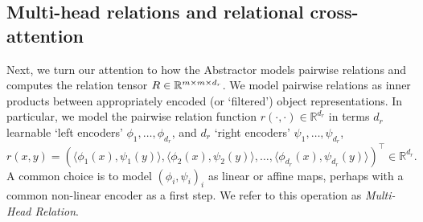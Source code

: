 %
%
%
%
%



\subsection{Multi-head relations and relational cross-attention}\label{ssec:multiheadrelations}

Next, we turn our attention to how the Abstractor models pairwise relations and computes the relation tensor $R \in \mathbb{R}^{m \times m \times d_r}$. We model pairwise relations as inner products between appropriately encoded (or `filtered') object representations. In particular, we model the pairwise relation function $r(\cdot, \cdot) \in \mathbb{R}^{d_r}$ in terms $d_r$ learnable `left encoders' $\phi_1, \ldots, \phi_{d_r}$, and $d_r$ `right encoders' $\psi_1, \ldots, \psi_{d_r}$,
\begin{equation}\label{eq:multi_head_rel}
    r(x,y) = \left(\langle \phi_1(x), \psi_1(y) \rangle, \langle \phi_2(x), \psi_2(y) \rangle, \ldots, \langle \phi_{d_r}(x), \psi_{d_r}(y) \rangle \right)^\top \in \mathbb{R}^{d_r}.
\end{equation}
A common choice is to model $(\phi_i, \psi_i)_i$ as linear or affine maps, perhaps with a common non-linear encoder as a first step. We refer to this operation as \textit{Multi-Head Relation}.

